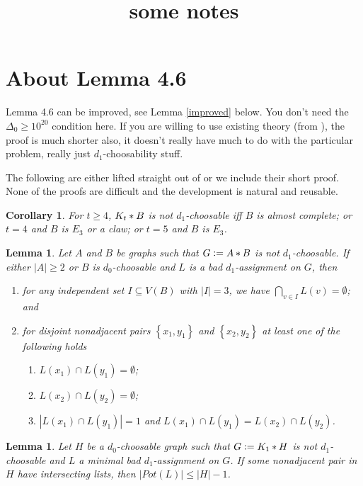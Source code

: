 \documentclass[12pt]{amsart}
\title{some notes}
\theoremstyle{plain}
\newtheorem{lem}[thm]{Lemma}
\newtheorem{cor}[thm]{Corollary}
\theoremstyle{definition}
\theoremstyle{plain}
\newcommand{\set}[1]{\left\{ #1 \right\}}
\newcommand{\card}[1]{\left|#1\right|}
\newcommand{\join}[2]{#1 \mbox{\hspace{2 pt}$\ast$\hspace{2 pt}} #2}
\newcommand{\DefinedAs}{\mathrel{\mathop:}=}
\begin{document}
\maketitle

\section{About Lemma 4.6}
Lemma 4.6 can be improved, see Lemma \ref{improved} below.  You don't need the $\Delta_0 \geq 10^{20}$ condition here.  If you are willing to use existing theory (from \cite{mules}), the proof is much shorter also, it doesn't really have much to do with the particular problem, really just $d_1$-choosability stuff. 

\bigskip

The following are either lifted straight out of \cite{mules} or we include their short proof.  None of the proofs are difficult and the development is natural and reusable.

\begin{cor}\label{K_tClassification}
For $t \geq 4$, $\join{K_t}{B}$ is not $d_1$-choosable iff $B$ is almost complete; or $t = 4$ and $B$ is $E_3$ or a claw; or $t = 5$ and $B$ is $E_3$.
\end{cor}

\begin{lem}\label{IntersectionsInB}
Let $A$ and $B$ be graphs such that $G \DefinedAs
\join{A}{B}$ is not $d_1$-choosable.  If either $\card{A} \geq 2$ or $B$ is
$d_0$-choosable and $L$ is a bad $d_1$-assignment on $G$, then
\begin{enumerate}
\item for any independent set $I \subseteq V(B)$ with $\card{I} = 3$, we have
$\bigcap_{v \in I} L(v) = \emptyset$; and
\item for disjoint nonadjacent pairs $\set{x_1, y_1}$ and $\set{x_2, y_2}$ at least one of the following holds
	\begin{enumerate}
	\item $L(x_1) \cap L(y_1) = \emptyset$;
	\item $L(x_2) \cap L(y_2) = \emptyset$;
	\item $\card{L(x_1) \cap L(y_1)} = 1$ and $L(x_1) \cap L(y_1) = L(x_2) \cap L(y_2)$.
	\end{enumerate}
\end{enumerate}
\end{lem}

\begin{lem}\label{NeighborhoodPotShrink}
Let $H$ be a $d_0$-choosable graph such that $G \DefinedAs \join{K_1}{H}$ is not
$d_1$-choosable and $L$ a minimal bad $d_1$-assignment on $G$.  If some
nonadjacent pair in $H$ have intersecting lists, then $\card{Pot(L)} \leq \card{H} - 1$.
\end{lem}
\end{document}
